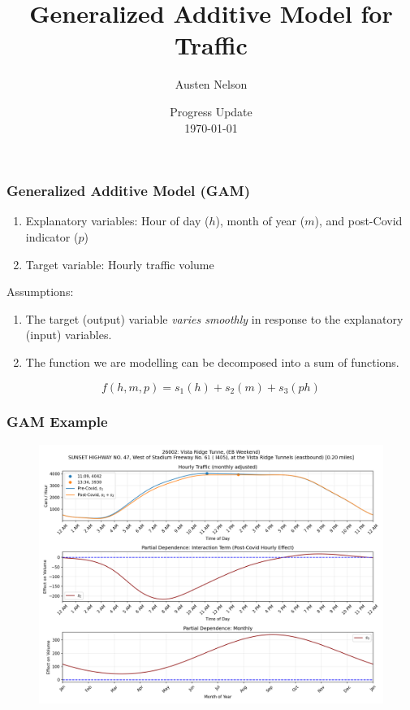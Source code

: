 \documentclass[xcolor=dvipsnames]{beamer}
\title{Generalized Additive Model for Traffic}
\author[Nelson]{Austen Nelson\inst{1}}
\institute[short]{\tiny
\vspace*{-0.2cm}
 \inst{1}
Portland State University\\
}
\date[\today]
{{\color{blue} Progress Update}\\ \today}
\begin{document}
\frame{\titlepage}
\begin{frame}
  \frametitle{Generalized Additive Model (GAM)}

\begin{enumerate}
  \item Explanatory variables: Hour of day ($h$), month of year ($m$), and post-Covid indicator ($p$)
  \item Target variable: Hourly traffic volume
\end{enumerate}

  \vspace{1em}

  Assumptions:
\begin{enumerate}
    \item The target (output) variable \emph{varies smoothly} in response to the explanatory (input) variables. 
    \item The function we are modelling can be decomposed into a sum of functions. 
\end{enumerate}

$$f(h, m, p) = s_1(h) + s_2(m) + s_3(ph)$$
\end{frame}

\begin{frame}
  \frametitle{GAM Example}
  \begin{figure}[b]{\textwidth}
    \includegraphics[width=.8\textwidth]{26002_Vista-Ridge-Tunne_EB_Weekend_gam.png}
  \end{figure}
\end{frame}
\end{document}
